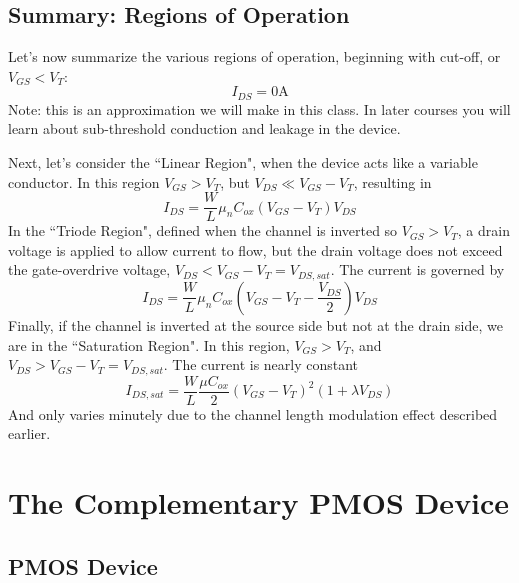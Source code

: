 \subsection{Summary: Regions of Operation}

Let's now summarize the various regions of operation, beginning with cut-off, or $V_{GS} < V_T$:
\begin{equation}
	I_{DS} = 0\mathrm{A}
\end{equation}
%
Note: this is an approximation we will make in this class.  In later courses you will learn about sub-threshold conduction and leakage in the device.  

Next, let's consider the ``Linear Region", when the device acts like a variable conductor.  In this region  $V_{GS} > V_T$, but $V_{DS} \ll V_{GS} - V_T$, resulting in
\begin{equation}
	{I_{DS}} = \frac{W}{L}{\mu _n}{C_{ox}}({V_{GS}} - {V_T}){V_{DS}}
\end{equation}
%
In the ``Triode Region", defined when the channel is inverted so $V_{GS} > V_T$, a drain voltage is applied to allow current to flow, but the drain voltage does not exceed the gate-overdrive voltage, $V_{DS} < V_{GS} - V_T = V_{DS,sat}$.  The current is governed by
%
\begin{equation}
	{I_{DS}} = \frac{W}{L}{\mu _n}{C_{ox}}({V_{GS}} - {V_T} - \frac{{{V_{DS}}}}{2}){V_{DS}}
\end{equation}
%
Finally, if the channel is inverted at the source side but not at the drain side, we are in the ``Saturation Region".  In this region, $V_{GS} > V_T$, and $V_{DS} > V_{GS} - V_T = V_{DS,sat}$.  The current is nearly constant
%
\begin{equation}
	{I_{DS,sat}} = \frac{W}{L}\frac{{\mu {C_{ox}}}}{2}{({V_{GS}} - {V_T})^2}(1 + \lambda {V_{DS}})
\end{equation}
%
And only varies minutely due to the channel length modulation effect described earlier. 






\section{The Complementary PMOS Device}





\subsection{PMOS Device}


